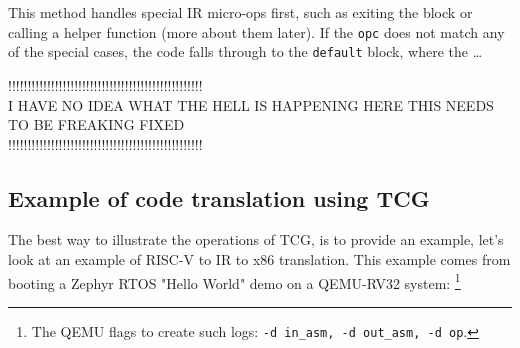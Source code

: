 \noindent
This method handles special IR micro-ops first, such as exiting the block or calling a helper function (more about them
later). If the \texttt{opc} does not match any of the special cases, the code falls through to the \texttt{default}
block, where the \dots

\noindent
{!!!!!!!!!!!!!!!!!!!!!!!!!!!!!!!!!!!!!!!!!!!!!!!!!!}\\
{I HAVE NO IDEA WHAT THE HELL IS HAPPENING HERE}
{THIS NEEDS TO BE FREAKING FIXED}\\
{!!!!!!!!!!!!!!!!!!!!!!!!!!!!!!!!!!!!!!!!!!!!!!!!!!}

\pagebreak
\subsection{Example of code translation using TCG}

The best way to illustrate the operations of TCG, is to provide an example, let's look at an example of RISC-V to IR to
x86 translation. This example comes from booting a Zephyr RTOS "Hello World" demo on a QEMU-RV32 system:%
\footnote{The QEMU flags to create such logs: \texttt{-d in\_asm, -d out\_asm, -d op}.}

